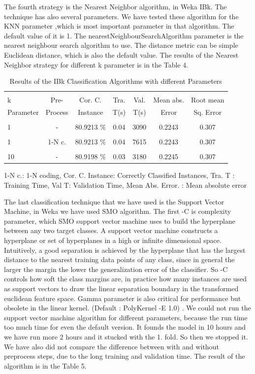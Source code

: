 \documentclass[a4paper]{article}
\begin{document}
The fourth strategy is the  Nearest Neighbor algorithm, in Weka IBk. The
technique has also several parameters. We have tested these algorithm for the
KNN parameter ,which is most important parameter in that algorithm. The default
value of it is 1. The nearestNeighbourSearchAlgorithm parameter is the nearest
neighbour search algorithm to use. The distance metric can be simple Euclidean
distance, which is also the default value. The results of the  Nearest Neighbor
strategy for different k parameter is in the Table 4.

\begin{table}
\begin{tabular}{|l| c | c | c | c |c |c |}

\hline & & & & & & \\
k &  Pre- & Cor. C. & Tra. & Val. & Mean abs.  & Root mean \\
Parameter& Process & Instance & T(s) &  T(s) & Error & Sq. Error \\
\hline & & & & & & \\
1 	 & - &			80.9213		   $\%$ &	0.04		& 	3090	 & 	0.2243	 & 0.307  \\ 
\hline & & & & & & \\	
1 	 & 1-N c.  &		 80.9213		   $\%$ &	0.04		& 	7615	 & 	 0.2243	 &  0.307  \\ 
\hline & & & & & & \\	
10	 & - &		  	80.9198		 $\%$ &	0.03		& 	3180  	&	0.2245	 & 	0.307 	  \\ 
\hline
\end{tabular}
\caption{Results of the IBk Classification Algorithms with different Parameters}
	 1-N c.: 1-N coding,
	Cor. C. Instance:  Correctly Classified Instances,
	Tra. T : Training Time,
	Val T: Validation Time,
	Mean Abs. Error. : Mean absolute error 
\end{table}

The last classification technique that we have used is the Support Vector
Machine, in Weka we have used SMO algorithm. The first -C is complexity
parameter, which SMO support vector machine uses to build the hyperplane
between any two target classes. A support vector machine constructs a
hyperplane or set of hyperplanes in a high or infinite dimensional space.
Intuitively, a good separation is achieved by the hyperplane that has the
largest distance to the nearest training data points of any class, since in
general the larger the margin the lower the generalization error of the
classifier. So -C controls how soft the class margins are, in practice how many
instances are used as support vectors to draw the linear separation boundary in
the transformed euclidean feature space. Gamma parameter is also critical for
performance but obsolete in the linear kernel. (Default : PolyKernel -E 1.0) .
We could not run the support vector machine algorithm for different parameters,
because the run time too much time for even the default version. It founds the
model in 10 hours and we have run more 2 hours and it stucked with the 1. fold.
So then we stopped it. We have also did not  compare the difference between
with and without preprocess steps, due to the long training and validation
time. The result of the algorithm is in the Table 5.
\end{document}
